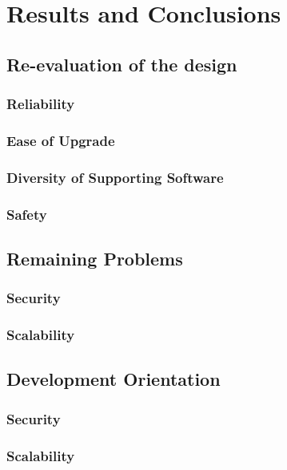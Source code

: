 \section{Results and Conclusions}
\subsection{Re-evaluation of the design}
\subsubsection{Reliability}

\subsubsection{Ease of Upgrade}

\subsubsection{Diversity of Supporting Software}

\subsubsection{Safety}

\subsection{Remaining Problems}
\subsubsection{Security}

\subsubsection{Scalability}

\subsection{Development Orientation}
\subsubsection{Security}

\subsubsection{Scalability}
